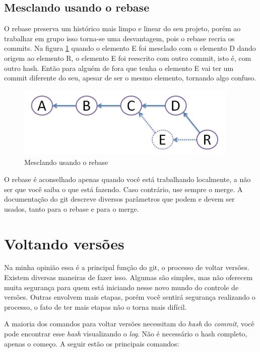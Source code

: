 \documentclass[12pt,openright,oneside,a4paper,english,brazil]{abntex2}
\begin{document}
\subsection{Mesclando usando o rebase}

O rebase preserva um histórico mais limpo e linear do seu projeto, porém ao trabalhar em grupo isso torna-se uma desvantagem, pois o rebase recria os commits. Na figura \ref{rebase} quando o elemento E foi mesclado com o elemento D dando origem ao elemento R, o elemento E foi reescrito com outro commit, isto é, com outro hash. Então para alguém de fora que tenha o elemento E vai ter um commit diferente do seu, apesar de ser o mesmo elemento, tornando algo confuso.

\begin{figure}[H]
	\caption{\label{rebase}Mesclando usando o rebase}
	\begin{center}
		\includegraphics[width=0.5\linewidth]{imagens/rebase}
	\end{center}
\end{figure}

O rebase é aconselhado apenas quando você está trabalhando localmente, a não ser que você saiba o que está fazendo. Caso contrário, use sempre o merge. A documentação do git descreve diversos parâmetros que podem e devem ser usados, tanto para o rebase e para o merge.

\section{Voltando versões}

Na minha opinião essa é a principal função do git, o processo de voltar versões. Existem diversas maneiras de fazer isso. Algumas são simples, mas não oferecem muita segurança para quem está iniciando nesse novo mundo do controle de versões. Outras envolvem mais etapas, porém você sentirá segurança realizando o processo, o fato de ter mais etapas não o torna mais difícil.

A maioria dos comandos para voltar versões necessitam do \textit{hash} do \textit{commit}, você pode encontrar esse \textit{hash} visualizando o \textit{log}. Não é necessário o hash completo, apenas o começo. A seguir estão os principais comandos:
\end{document}
